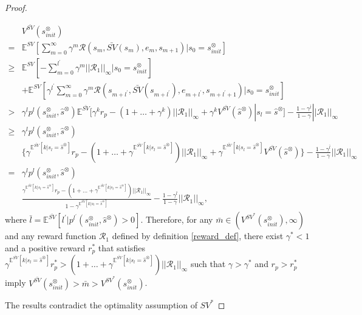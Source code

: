 \documentclass[10pt]{article}
\newtheorem{proof}{Proof}
\begin{document}
\begin{proof}
\begin{enumerate}
    \begin{align}
      & V^{\bar{SV}}(s^{\otimes}_{init}) \nonumber \\
      = & \mathbb{E}^{SV}[ {\sum_{m=0}^{\infty}} \gamma^m \mathcal{R}(s_m, \bar{SV}(s_m), e_m, s_{m+1}) | s_0 = s^{\otimes}_{init} ] \nonumber \\
      \geq & \mathbb{E}^{SV}[ - \sum_{m=0}^{l^{\prime}} \gamma^m ||\mathcal{R}_1||_{\infty} | s_0 = s^{\otimes}_{init } ] \nonumber \\
      & + \mathbb{E}^{SV}[ \gamma^{l^{\prime}} \sum_{m=0}^{\infty} \gamma^m \mathcal{R}(s_{m+l^{\prime}}, \bar{SV}(s_{m+l^{\prime}}), e_{m+l^{\prime}}, s_{m+l^{\prime}+1}) | s_0 = s^{\otimes}_{init} ] \nonumber \\
      > &  \gamma^{l} p^{l}(s^{\otimes}_{init}, \hat{s}^{\otimes}) \mathbb{E}^{\bar{SV}} [ \gamma^k r_p - (1 + \ldots + \gamma^k) ||\mathcal{R}_1||_{\infty} + \gamma^k V^{\bar{SV}}(\hat{s}^{\otimes}) | s_{l} = \hat{s}^{\otimes} ] - \frac{1 - \gamma^{\bar{l}}} {1 - \gamma} ||\mathcal{R}_1||_{\infty} \nonumber \\
      \geq & \gamma^{l} p^{l}(s^{\otimes}_{init}, \hat{s}^{\otimes}) \nonumber \\
      & \{ \gamma^{\mathbb{E}^{\bar{SV}}[k | s_{l} = \hat{s}^{\otimes} ]} r_p - (1 + \ldots + \gamma^{\mathbb{E}^{\bar{SV}}[k | s_{l} = \hat{s}^{\otimes} ]} ) ||\mathcal{R}_1||_{\infty} + \gamma^{\mathbb{E}^{\bar{SV}}[k | s_{l} = \hat{s}^{\otimes} ]} V^{\bar{SV}}(\hat{s}^{\otimes}) \} - \frac{1 - \gamma^{\bar{l}}} {1 - \gamma} ||\mathcal{R}_1||_{\infty} \nonumber \\
      = & \gamma^{l} p^{l}(s^{\otimes}_{init}, \hat{s}^{\otimes}) \nonumber \\
      & \frac{ \gamma^{\mathbb{E}^{\bar{SV}}[k | s_{l} = \hat{s}^{\otimes} ]} r_p - (1 + \ldots + \gamma^{\mathbb{E}^{\bar{SV}}[k | s_{l} = \hat{s}^{\otimes} ]} ) ||\mathcal{R}_1||_{\infty} } { 1 - \gamma^{\mathbb{E}^{\bar{SV}}[k | s_{l} = \hat{s}^{\otimes} ]}} - \frac{1 - \gamma^{\bar{l}}} {1 - \gamma} ||\mathcal{R}_1||_{\infty} , \nonumber
    \end{align}
    where $\bar{l} = \mathbb{E}^{\bar{SV}}[l^{\prime}|p^{l^{\prime}}(s^{\otimes}_{init}, \hat{s}^{\otimes}) > 0]$.
    Therefore, for any $\bar{m} \in (V^{SV^{\ast}}(s^{\otimes}_{init}), \infty)$ and any reward function $\mathcal{R}_1$ defined by definition \ref{reward_def}, there exist $\gamma^{\ast} < 1$ and a positive reward $r^{\ast}_p$ that satisfies $\gamma^{\mathbb{E}^{\bar{SV}}[k | s_{l} = \hat{s}^{\otimes} ]} r^{\ast}_p > (1 + \ldots + \gamma^{\mathbb{E}^{\bar{SV}}[k | s_{l} = \hat{s}^{\otimes} ]} ) ||\mathcal{R}_1||_{\infty}$ such that $\gamma > \gamma^{\ast} $ and $r_p > r^{\ast}_p$ imply $V^{\bar{SV}}(s^{\otimes}_{init}) > \bar{m} > V^{SV^{\ast}}(s^{\otimes}_{init})$.
  \end{enumerate}

  The results contradict the optimality assumption of $SV^{\ast}$
\end{proof}
\end{document}
